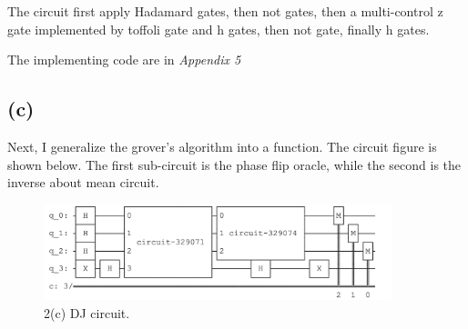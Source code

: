 \documentclass{article}
\begin{document}
\begin{CJK*}{UTF8}{bsmi}
The circuit first apply Hadamard gates, then not gates, then a multi-control z gate implemented by toffoli gate and h gates, then not gate, finally h gates.

The implementing code are in \emph {Appendix 5}

\subsection{(c)}
Next, I generalize the grover's algorithm into a function. The circuit figure is shown below. The first sub-circuit is the phase flip oracle, while the second is the inverse about mean circuit.
\begin{figure}[h]
    \centering
    \includegraphics[width=0.9\textwidth]{2c.png}
    \caption{\label{fig:2c.png}2(c) DJ circuit.}
    \end{figure}


\end{CJK*}
\end{document}

